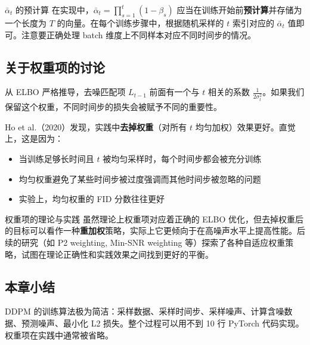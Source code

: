 \begin{warningbox}{$\bar{\alpha}_t$ 的预计算}
在实现中，$\bar{\alpha}_t = \prod_{s=1}^{t}(1-\beta_s)$ 应当在训练开始前\textbf{预计算}并存储为一个长度为 $T$ 的向量。在每个训练步骤中，根据随机采样的 $t$ 索引对应的 $\bar{\alpha}_t$ 值即可。注意要正确处理 batch 维度上不同样本对应不同时间步的情况。
\end{warningbox}

\subsection{关于权重项的讨论}

从 ELBO 严格推导，去噪匹配项 $L_{t-1}$ 前面有一个与 $t$ 相关的系数 $\frac{1}{2\sigma_t^2}$。如果我们保留这个权重，不同时间步的损失会被赋予不同的重要性。

Ho et al.（2020）发现，实践中\textbf{去掉权重}（对所有 $t$ 均匀加权）效果更好。直觉上，这是因为：

\begin{itemize}
    \item 当训练足够长时间且 $t$ 被均匀采样时，每个时间步都会被充分训练
    \item 均匀权重避免了某些时间步被过度强调而其他时间步被忽略的问题
    \item 实验上，均匀权重的 FID 分数往往更好
\end{itemize}

\begin{knowledgebox}{权重项的理论与实践}
虽然理论上权重项对应着正确的 ELBO 优化，但去掉权重后的目标可以看作一种\textbf{重加权}策略，实际上它更倾向于在高噪声水平上提高性能。后续的研究（如 P2 weighting, Min-SNR weighting 等）探索了各种自适应权重策略，试图在理论正确性和实践效果之间找到更好的平衡。
\end{knowledgebox}

\subsection{本章小结}

DDPM 的训练算法极为简洁：采样数据、采样时间步、采样噪声、计算含噪数据、预测噪声、最小化 L2 损失。整个过程可以用不到 10 行 PyTorch 代码实现。权重项在实践中通常被省略。


